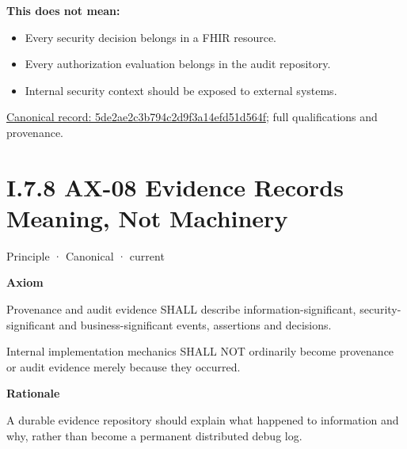 \textbf{This does not mean:}



\begin{itemize}


\item Every security decision belongs in a FHIR resource.

\item Every authorization evaluation belongs in the audit repository.

\item Internal security context should be exposed to external systems.

\end{itemize}

{\footnotesize \href{../../../../../../../continuum/motivation/principle/architectural-axiom/5de2ae2c3b794c2d9f3a14efd51d564f.md}{Canonical record: 5de2ae2c3b794c2d9f3a14efd51d564f}; full qualifications and provenance.}\par
\section*{I.7.8 AX-08 Evidence Records Meaning, Not Machinery}
\label{navigation:I.7.8}

\label{element:21d6864657964ba5b03e3f6b5eb29cd5}
{\small Principle · Canonical · current}\par

\par\medskip\textbf{Axiom}\par


Provenance and audit evidence SHALL describe information-significant,
security-significant and business-significant events, assertions and
decisions.



Internal implementation mechanics SHALL NOT ordinarily become provenance
or audit evidence merely because they occurred.



\par\medskip\textbf{Rationale}\par


A durable evidence repository should explain what happened to
information and why, rather than become a permanent distributed debug
log.



